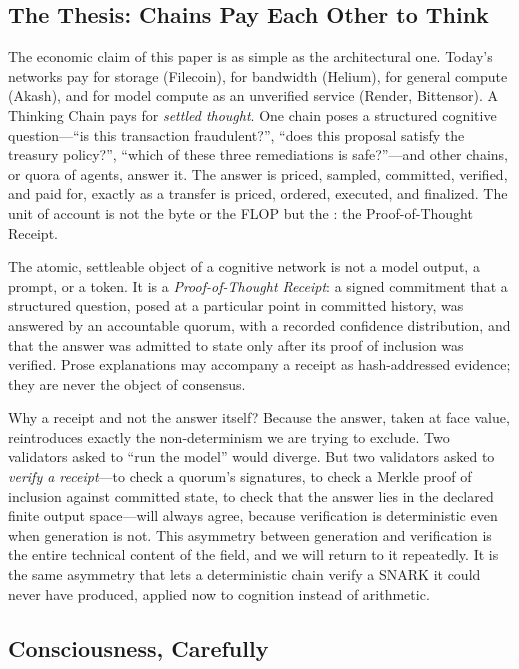 \subsection{The Thesis: Chains Pay Each Other to Think}

The economic claim of this paper is as simple as the architectural one. Today's networks pay for storage (Filecoin), for bandwidth (Helium), for general compute (Akash), and for model compute as an unverified service (Render, Bittensor). A Thinking Chain pays for \emph{settled thought}. One chain poses a structured cognitive question---``is this transaction fraudulent?'', ``does this proposal satisfy the treasury policy?'', ``which of these three remediations is safe?''---and other chains, or quora of agents, answer it. The answer is priced, sampled, committed, verified, and paid for, exactly as a transfer is priced, ordered, executed, and finalized. The unit of account is not the byte or the FLOP but the \PoT{}: the Proof-of-Thought Receipt.

\begin{principle}
The atomic, settle\-able object of a cognitive network is not a model output, a prompt, or a token. It is a \emph{Proof-of-Thought Receipt}: a signed commitment that a structured question, posed at a particular point in committed history, was answered by an accountable quorum, with a recorded confidence distribution, and that the answer was admitted to state only after its proof of inclusion was verified. Prose explanations may accompany a receipt as hash-addressed evidence; they are never the object of consensus.
\end{principle}

Why a receipt and not the answer itself? Because the answer, taken at face value, reintroduces exactly the non-determinism we are trying to exclude. Two validators asked to ``run the model'' would diverge. But two validators asked to \emph{verify a receipt}---to check a quorum's signatures, to check a Merkle proof of inclusion against committed state, to check that the answer lies in the declared finite output space---will always agree, because verification is deterministic even when generation is not. This asymmetry between generation and verification is the entire technical content of the field, and we will return to it repeatedly. It is the same asymmetry that lets a deterministic chain verify a SNARK it could never have produced, applied now to cognition instead of arithmetic.

\subsection{Consciousness, Carefully}

